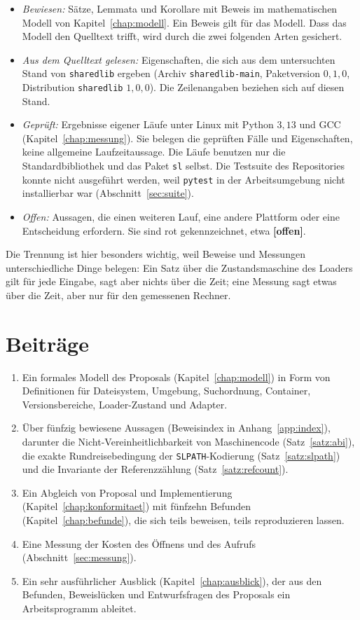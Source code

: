 \documentclass[a4paper,12pt,twoside]{report}
\DeclareRobustCommand{\_}{\ifmmode\mbox{\textunderscore}\else\textunderscore\allowbreak{}\fi}
\theoremstyle{definition}
\newcommand{\offen}[1]{\textcolor{accentred}{\textbf{[#1]}}}
\begin{document}
\begin{itemize}
	\item \emph{Bewiesen:} Sätze, Lemmata und Korollare mit Beweis im mathematischen Modell von Kapitel~\ref{chap:modell}. Ein Beweis gilt für das Modell. Dass das Modell den Quelltext trifft, wird durch die zwei folgenden Arten gesichert.
	\item \emph{Aus dem Quelltext gelesen:} Eigenschaften, die sich aus dem untersuchten Stand von \texttt{sharedlib} ergeben (Archiv \texttt{sharedlib-main}, Paketversion $0{,}1{,}0$, Distribution \texttt{sharedlib} $1{,}0{,}0$). Die Zeilenangaben beziehen sich auf diesen Stand.
	\item \emph{Geprüft:} Ergebnisse eigener Läufe unter Linux mit Python $3{,}13$ und GCC (Kapitel~\ref{chap:messung}). Sie belegen die geprüften Fälle und Eigenschaften, keine allgemeine Laufzeitaussage. Die Läufe benutzen nur die Standardbibliothek und das Paket \texttt{sl} selbst. Die Testsuite des Repositories konnte nicht ausgeführt werden, weil \texttt{pytest} in der Arbeitsumgebung nicht installierbar war (Abschnitt~\ref{sec:suite}).
	\item \emph{Offen:} Aussagen, die einen weiteren Lauf, eine andere Plattform oder eine Entscheidung erfordern. Sie sind rot gekennzeichnet, etwa \offen{offen}.
\end{itemize}

Die Trennung ist hier besonders wichtig, weil Beweise und Messungen unterschiedliche Dinge belegen: Ein Satz über die Zustandsmaschine des Loaders gilt für jede Eingabe, sagt aber nichts über die Zeit; eine Messung sagt etwas über die Zeit, aber nur für den gemessenen Rechner.

\section{Beiträge}

\begin{enumerate}
	\item Ein formales Modell des Proposals (Kapitel~\ref{chap:modell}) in Form von Definitionen für Dateisystem, Umgebung, Suchordnung, Container, Versionsbereiche, Loader-Zustand und Adapter.
	\item Über fünfzig bewiesene Aussagen (Beweisindex in Anhang~\ref{app:index}), darunter die Nicht-Vereinheitlichbarkeit von Maschinencode (Satz~\ref{satz:abi}), die exakte Rundreisebedingung der \texttt{SL\_PATH}-Kodierung (Satz~\ref{satz:slpath}) und die Invariante der Referenzzählung (Satz~\ref{satz:refcount}).
	\item Ein Abgleich von Proposal und Implementierung (Kapitel~\ref{chap:konformitaet}) mit fünfzehn Befunden (Kapitel~\ref{chap:befunde}), die sich teils beweisen, teils reproduzieren lassen.
	\item Eine Messung der Kosten des Öffnens und des Aufrufs (Abschnitt~\ref{sec:messung}).
	\item Ein sehr ausführlicher Ausblick (Kapitel~\ref{chap:ausblick}), der aus den Befunden, Beweislücken und Entwurfsfragen des Proposals ein Arbeitsprogramm ableitet.
\end{enumerate}
\end{document}
